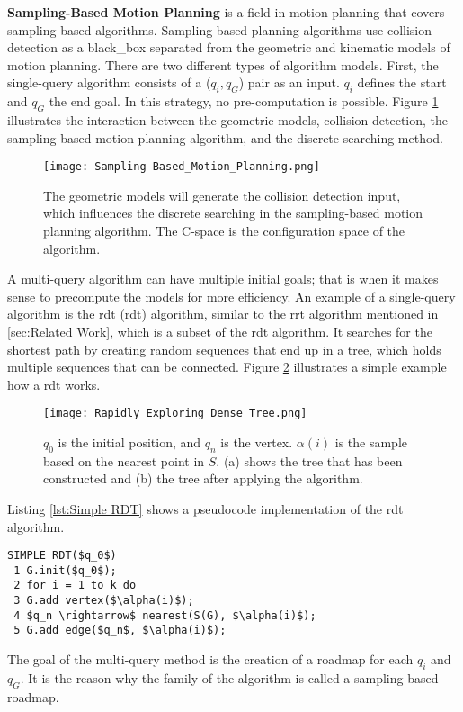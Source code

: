 \textbf{Sampling-Based Motion Planning} is a field in motion planning that covers sampling-based algorithms. Sampling-based planning algorithms use collision detection as a \Gls{black_box} separated from the geometric and kinematic models of motion planning. There are two different types of algorithm models. First, the single-query algorithm consists of a ($q_i,q_G$) pair as an input. $q_i$ defines the start and $q_G$ the end goal. In this strategy, no pre-computation is possible. Figure \ref{fig:Geometric Models Collision Detection Algorithm} illustrates the interaction between the geometric models, collision detection, the sampling-based motion planning algorithm, and the discrete searching method.
\begin{figure}[H]
    \centering
    \texttt{[image: Sampling-Based\_Motion\_Planning.png]}
    \caption{The geometric models will generate the collision detection input, which influences the discrete searching in the sampling-based motion planning algorithm. The C-space is the configuration space of the algorithm. \cite{planning_algorithms_steven_m_lavalle}}
    \label{fig:Geometric Models Collision Detection Algorithm}
\end{figure}
A multi-query algorithm can have multiple initial goals; that is when it makes sense to precompute the models for more efficiency. An example of a single-query algorithm is the \acrlong{rdt} (\acrshort{rdt}) algorithm, similar to the \acrshort{rrt} algorithm mentioned in \ref{sec:Related Work}, which is a subset of the \acrshort{rdt} algorithm. It searches for the shortest path by creating random sequences that end up in a tree, which holds multiple sequences that can be connected. Figure \ref{fig:Rapidly Exploring Dense Tree} illustrates a simple example how a \acrshort{rdt} works.
\begin{figure}[H]
    \centering
    \texttt{[image: Rapidly\_Exploring\_Dense\_Tree.png]}
    \caption{$q_0$ is the initial position, and $q_n$ is the vertex. $\alpha(i)$ is the sample based on the nearest point in $S$. (a) shows the tree that has been constructed and (b) the tree after applying the algorithm. \cite{planning_algorithms_steven_m_lavalle}}
    \label{fig:Rapidly Exploring Dense Tree}
\end{figure}

\pagebreak

Listing \ref{lst:Simple RDT} shows a pseudocode implementation of the \acrshort{rdt} algorithm.
\begin{lstlisting}[mathescape=true, caption={The simple \acrshort{rdt} computes a random tree with the nearest function. \cite{planning_algorithms_steven_m_lavalle}}, label={lst:Simple RDT}]
SIMPLE RDT($q_0$)
 1 G.init($q_0$);
 2 for i = 1 to k do
 3 G.add vertex($\alpha(i)$);
 4 $q_n \rightarrow$ nearest(S(G), $\alpha(i)$);
 5 G.add edge($q_n$, $\alpha(i)$);
\end{lstlisting}
The goal of the multi-query method is the creation of a roadmap for each $q_i$ and $q_G$. It is the reason why the family of the algorithm is called a sampling-based roadmap. \cite{planning_algorithms_steven_m_lavalle}

